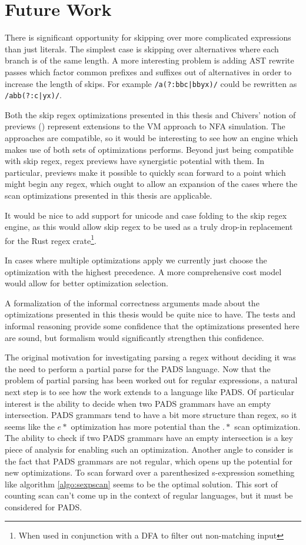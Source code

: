 \chapter{Future Work}
\label{chapter:futurework}

There is significant opportunity for skipping over more complicated
expressions than just literals. The simplest case is skipping over
alternatives where each branch is of the same length. A more interesting
problem is adding AST rewrite passes which factor common prefixes and
suffixes out of alternatives in order to increase the length of skips.
For example \verb'/a(?:bbc|bbyx)/' could be rewritten as
\verb'/abb(?:c|yx)/'.

Both the skip regex optimizations presented in this thesis and
Chivers' notion of previews (\cite{Chivers2016}) represent
extensions to the VM approach to NFA simulation. The approaches
are compatible, so it would be interesting to see how an engine
which makes use of both sets of optimizations performs. Beyond
just being compatible with skip regex, regex previews have
synergistic potential with them. In particular, previews make
it possible to quickly scan forward to a point which might begin
any regex, which ought to allow an expansion of the cases where
the scan optimizations presented in this thesis are applicable.

It would be nice to add support for unicode and case folding to
the skip regex engine, as this would allow skip regex to be used
as a truly drop-in replacement for the Rust regex crate\footnote{
When used in conjunction with a DFA to filter out non-matching
input}.

In cases where multiple optimizations apply we currently just
choose the optimization with the highest precedence. A more comprehensive
cost model would allow for better optimization selection.

A formalization of the informal correctness arguments made about
the optimizations presented in this thesis would be quite nice
to have. The tests and informal reasoning provide some confidence
that the optimizations presented here are sound, but formalism
would significantly strengthen this confidence.

The original motivation for investigating parsing a regex without
deciding it was the need to perform a partial parse for the PADS
language. Now that the problem of partial parsing has been worked
out for regular expressions, a natural next step is to see how
the work extends to a language like PADS. Of particular interest
is the ability to decide when two PADS grammars have an empty
intersection. PADS grammars tend to have a bit more structure
than regex, so it seems like the $e*$ optimization has more
potential than the $.*$ scan optimization. The ability to check
if two PADS grammars have an empty intersection is a key piece
of analysis for enabling such an optimization. Another angle
to consider is the fact that PADS grammars are not regular,
which opens up the potential for new optimizations. To scan
forward over a parenthesized s-expression something like
algorithm \ref{algo:sexpscan} seems to be the
optimal solution. This sort of counting scan can't come up
in the context of regular languages, but it must be considered for PADS.

